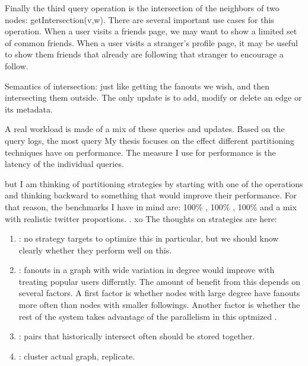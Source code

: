 \documentclass{article}
\begin{document}
Finally the third query operation is the intersection of the neighbors of two nodes: {\code getIntersection(v,w)}.
There are several important use cases for this operation. When a user visits a friends page, we may want to show a limited set of common friends.  When a user visits a stranger's profile page, it may be useful to show them friends that already are following that stranger to encourage a follow.

Semantics of intersection: just like getting the fanouts we wish, and then intersecting them outside.
The only update is to add, modify or delete an edge or its metadata.


A real workload is made of a mix of these queries and updates. Based on the query logs, the most   query My thesis focuses on the effect different partitioning techniques have on performance. The measure I use for performance is the latency of the individual queries.  

but  I am thinking of  partitioning strategies by starting with one of the operations and thinking backward to something that would improve their performance. For that reason, the benchmarks I have in mind are: 100\% \edgeq, 100\% \fanoutq, 100\% \intersectq and a mix
with realistic twitter proportions. . 
xo
The thoughts on strategies are here:

\begin{enumerate}
\item \edgeq: no strategy targets to optimize this in particular, but we should know clearly whether they  perform well on this.
\item \fanoutq: fanouts in a graph with wide variation in degree would improve with treating popular users differntly. The amount of benefit from this depends on several factors. A first factor is whether nodes with large degree
have fanouts more often than nodes with smaller followings. Another factor is whether the rest of the system takes advantage of the parallelism in this optmized \fanoutq.  
\item \intersectq: pairs that historically intersect often should be stored together. 
\item \randomwalk: cluster actual graph, replicate. 
\end{enumerate}
\end{document}
